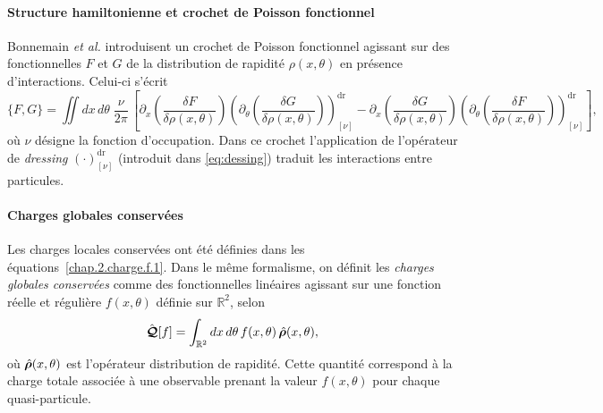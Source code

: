 \paragraph{Structure hamiltonienne et crochet de Poisson fonctionnel}  
Bonnemain \emph{et al.} \cite{bonnemain2024hamiltonian} introduisent un crochet de Poisson fonctionnel agissant sur des fonctionnelles $F$ et $G$ de la distribution de rapidité $\rho(x,\theta)$ en présence d’interactions. Celui-ci s’écrit
\begin{equation}\label{chap:GHD:eq.chochet.bonnemain.1}
	\{F,G\}
	=\iint dx\,d\theta\;\frac{\nu}{2\pi}\,
	\left[
		\partial_x \left( \frac{\delta F}{\delta \rho(x,\theta)} \right)
		\left( \partial_\theta \left( \frac{\delta G}{\delta \rho(x,\theta)} \right) \right)^{\mathrm{dr}}_{[\nu]}
		-
		\partial_x \left( \frac{\delta G}{\delta \rho(x,\theta)} \right)
		\left( \partial_\theta \left( \frac{\delta F}{\delta \rho(x,\theta)} \right) \right)^{\mathrm{dr}}_{[\nu]}
	\right],
\end{equation}
où $\nu$ désigne la fonction d’occupation. Dans ce crochet l'application de l’opérateur de \emph{dressing} $(\cdot)^{\mathrm{dr}}_{[\nu]}$ (introduit dans \eqref{eq:dessing})  traduit les interactions entre particules.


\medskip

\paragraph{Charges globales conservées}  
Les charges locales conservées ont été définies dans les équations~\eqref{chap.2.charge.f.1}.  
Dans le même formalisme, on définit les \emph{charges globales conservées} comme des fonctionnelles linéaires agissant sur une fonction réelle et régulière $f(x,\theta)$ définie sur $\mathbb{R}^2$, selon
\begin{equation}\label{chap:GHD:eq.charge.global.0}
	\hat{\bm{\mathcal{Q}}}[f] 
	= \int_{\mathbb{R}^2} dx\, d\theta\, f(x, \theta)\, \hat{\bm{\rho}}(x, \theta),
\end{equation}
où $\hat{\bm{\rho}}(x,\theta)$ est l'opérateur distribution de rapidité.  
Cette quantité correspond à la charge totale associée à une observable prenant la valeur $f(x,\theta)$ pour chaque quasi-particule.


